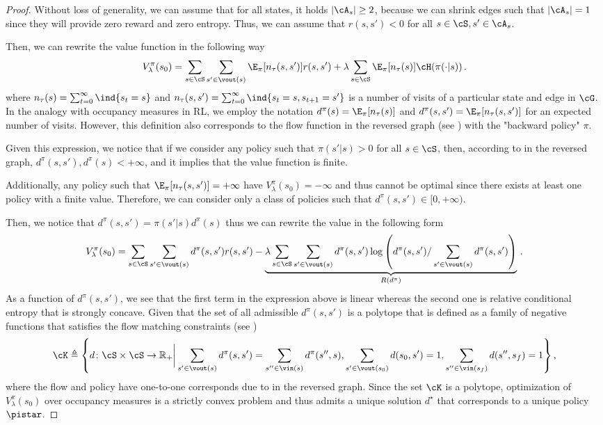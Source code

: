 \begin{proof}
    Without loss of generality, we can assume that for all states, it holds $|\cA_s| \geq 2$, because we can shrink edges such that $|\cA_s| = 1$ since they will provide zero reward and zero entropy. Thus, we can assume that $r(s,s') < 0$ for all $s \in \cS, s' \in \cA_s$.

    Then, we can rewrite the value function in the following way
    \[
        V^{\pi}_{\lambda}(s_0) = \sum_{s\in \cS}\sum_{s' \in \vout(s)} \E_{\pi}[n_\tau(s,s')] r(s,s') + \lambda \sum_{s\in \cS} \E_{\pi}[n_\tau(s)] \cH(\pi(\cdot | s)) \,.
    \]
    where $n_\tau(s) = \sum_{t=0}^\infty \ind\{s_t = s\}$ and $n_\tau(s, s') = \sum_{t=0}^\infty \ind\{s_t = s, s_{t+1} = s'\}$ is a number of visits of a particular state and edge in $\cG$. In the analogy with occupancy measures in RL, we employ the notation $d^{\pi}(s) = \E_{\pi}[n_\tau(s)]$ and $d^{\pi}(s,s') = \E_{\pi}[n_\tau(s,s')]$ for an expected number of visits. However, this definition also corresponds to the flow function in the reversed graph (see ) with the "backward policy" $\pi$.
    
    Given this expression, we notice that if we consider any policy such that $\pi(s'|s) > 0$ for all $s \in \cS$, then, according to  in the reversed graph, $d^{\pi}(s,s'), d^{\pi}(s) < +\infty$, and it implies that the value function is finite.
    
    Additionally, any policy such that $\E_{\pi}[n_\tau(s,s')] = +\infty$ have $V^{\pi}_{\lambda}(s_0) = -\infty$ and thus cannot be optimal since there exists at least one policy with a finite value. Therefore, we can consider only a class of policies such that $d^{\pi}(s,s') \in [0, +\infty)$.

    Then, we notice that $d^{\pi}(s,s') = \pi(s'|s) d^{\pi}(s)$ thus we can rewrite the value in the following form
    \[
       V^{\pi}_{\lambda}(s_0) =  \sum_{s\in \cS}\sum_{s' \in \vout(s)} d^{\pi}(s,s') r(s,s') - \underbrace{\lambda \sum_{s\in \cS} \sum_{s' \in \vout(s)} d^{\pi}(s,s') \log\left( d^{\pi}(s,s') / \sum_{s' \in \vout(s)} d^{\pi}(s,s') \right)}_{R(d^{\pi})}\,.
    \]
    As a function of $d^{\pi}(s,s')$, we see that the first term in the expression above is linear whereas the second one is relative conditional entropy \cite{neu2017unified} that is strongly concave. Given that the set of all admissible $d^{\pi}(s,s')$ is a polytope that is defined as a family of negative functions that satisfies the flow matching constraints (see )
    \[
        \cK \triangleq \left\{ d \colon \cS \times \cS \to \mathbb{R}_+ \bigg| \sum_{s' \in \vout(s)} d^{\pi}(s,s') = \sum_{s'' \in \vin(s)} d^{\pi}(s'', s), \sum_{s' \in \vout(s_0)}d(s_0, s') = 1, \sum_{s'' \in \vin(s_f)} d(s'',s_f) = 1  \right\},
    \]
    where the flow and policy have one-to-one corresponds due to  in the reversed graph. Since the set $\cK$ is a polytope, optimization of $V^{\pi}_{\lambda}(s_0)$ over occupancy measures is a strictly convex problem and thus admits a unique solution $d^\star$ that corresponds to a unique policy $\pistar$.
    

\end{proof}
